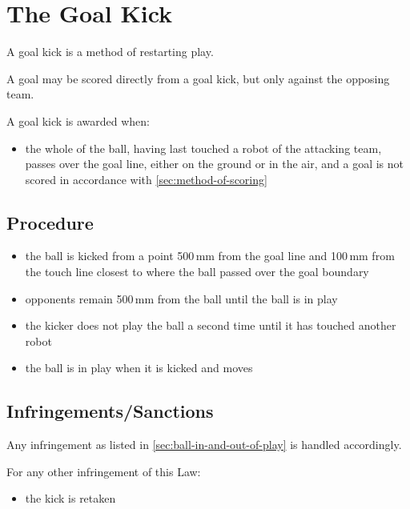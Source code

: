 \section{The Goal Kick}\label{sec:goal-kick}

A goal kick is a method of restarting play.

A goal may be scored directly from a goal kick, but only against the opposing team.

A goal kick is awarded when:

\begin{itemize}
\item the whole of the ball, having last touched a robot of the attacking team, passes over the goal line, either on the ground or in the air, and a goal is not scored in accordance with \autoref{sec:method-of-scoring}
\end{itemize}

\subsection{Procedure}
\begin{itemize}
\item the ball is kicked from a point 500\,mm from the goal line and 100\,mm from the touch line closest to where the ball passed over the goal boundary
\item opponents remain 500\,mm from the ball until the ball is in play
\item the kicker does not play the ball a second time until it has touched another robot
\item the ball is in play when it is kicked and moves
\end{itemize}

\subsection{Infringements/Sanctions}
Any infringement as listed in \autoref{sec:ball-in-and-out-of-play} is handled accordingly.

For any other infringement of this Law:
\begin{itemize}
\item the kick is retaken
\end{itemize}

